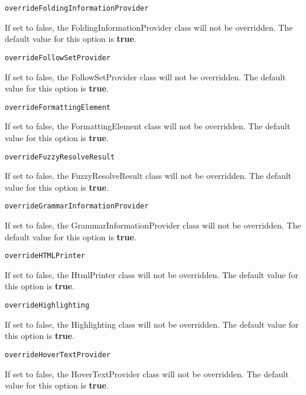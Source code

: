 \noindent\texttt{overrideFoldingInformationProvider}
\begin{myindentpar}{1cm}
If set to false, the FoldingInformationProvider class will not be overridden. The default value for this option is \textbf{true}.
\end{myindentpar}

\noindent\texttt{overrideFollowSetProvider}
\begin{myindentpar}{1cm}
If set to false, the FollowSetProvider class will not be overridden. The default value for this option is \textbf{true}.
\end{myindentpar}

\noindent\texttt{overrideFormattingElement}
\begin{myindentpar}{1cm}
If set to false, the FormattingElement class will not be overridden. The default value for this option is \textbf{true}.
\end{myindentpar}

\noindent\texttt{overrideFuzzyResolveResult}
\begin{myindentpar}{1cm}
If set to false, the FuzzyResolveResult class will not be overridden. The default value for this option is \textbf{true}.
\end{myindentpar}

\noindent\texttt{overrideGrammarInformationProvider}
\begin{myindentpar}{1cm}
If set to false, the GrammarInformationProvider class will not be overridden. The default value for this option is \textbf{true}.
\end{myindentpar}

\noindent\texttt{overrideHTMLPrinter}
\begin{myindentpar}{1cm}
If set to false, the HtmlPrinter class will not be overridden. The default value for this option is \textbf{true}.
\end{myindentpar}

\noindent\texttt{overrideHighlighting}
\begin{myindentpar}{1cm}
If set to false, the Highlighting class will not be overridden. The default value for this option is \textbf{true}.
\end{myindentpar}

\noindent\texttt{overrideHoverTextProvider}
\begin{myindentpar}{1cm}
If set to false, the HoverTextProvider class will not be overridden. The default value for this option is \textbf{true}.
\end{myindentpar}

